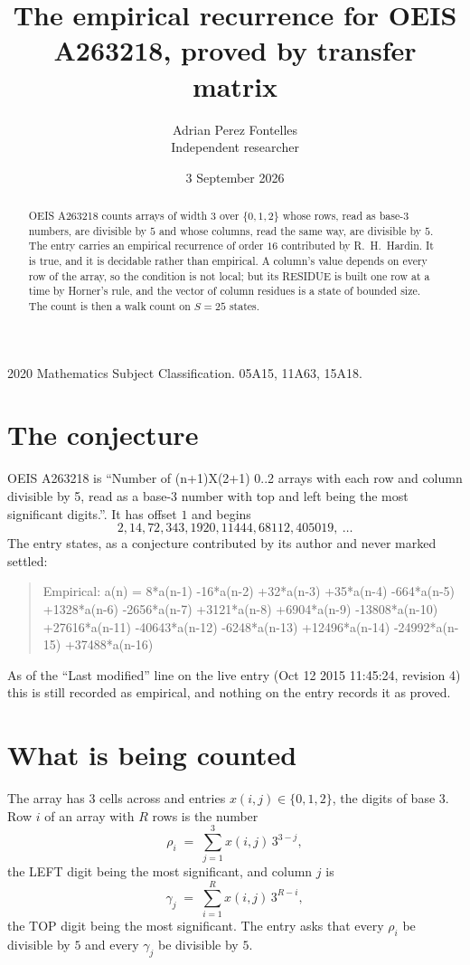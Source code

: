 \documentclass[11pt,a4paper]{article}
\title{The empirical recurrence for OEIS A263218, proved by transfer matrix}
\author{Adrian Perez Fontelles\\ \small Independent researcher}
\date{3 September 2026}
\theoremstyle{plain}
\theoremstyle{definition}
\begin{document}
\maketitle

\begin{abstract}
OEIS A263218 counts arrays of width $3$ over $\{0,1,2\}$ whose rows, read as base-$3$
numbers, are divisible by $5$ and whose columns, read the same way, are divisible by
$5$. The entry carries an empirical recurrence of order $16$ contributed by
R.~H.~Hardin. It is true, and it is decidable rather than empirical. A column's value depends on
every row of the array, so the condition is not local; but its RESIDUE is built one row at a
time by Horner's rule, and the vector of column residues is a state of bounded size. The count
is then a walk count on $S=25$ states.
\end{abstract}

\noindent\small 2020 Mathematics Subject Classification. 05A15, 11A63, 15A18.\normalsize

\section{The conjecture}

OEIS A263218 is ``Number of (n+1)X(2+1) 0..2 arrays with each row and column divisible by 5, read as a base-3 number with top and left being the most significant digits.''. It has offset $1$ and begins
\[
2, 14, 72, 343, 1920, 11444, 68112, 405019,\ \dots
\]
The entry states, as a conjecture contributed by its author and never marked settled:
\begin{quote}
Empirical: a(n) = 8*a(n-1) -16*a(n-2) +32*a(n-3) +35*a(n-4) -664*a(n-5) +1328*a(n-6) -2656*a(n-7) +3121*a(n-8) +6904*a(n-9) -13808*a(n-10) +27616*a(n-11) -40643*a(n-12) -6248*a(n-13) +12496*a(n-14) -24992*a(n-15) +37488*a(n-16)
\end{quote}
As of the ``Last modified'' line on the live entry (Oct 12 2015 11:45:24, revision 4) this is still
recorded as empirical, and nothing on the entry records it as proved.

\section{What is being counted}

The array has $3$ cells across and entries $x(i,j)\in\{0,1,2\}$, the digits of
base $3$. Row $i$ of an array with $R$ rows is the number
\[
\rho_i\;=\;\sum_{j=1}^{3}x(i,j)\,3^{3-j} ,
\]
the LEFT digit being the most significant, and column $j$ is
\[
\gamma_j\;=\;\sum_{i=1}^{R}x(i,j)\,3^{R-i} ,
\]
the TOP digit being the most significant. The entry asks that every $\rho_i$ be divisible by
$5$ and every $\gamma_j$ be divisible by $5$.
\end{document}
